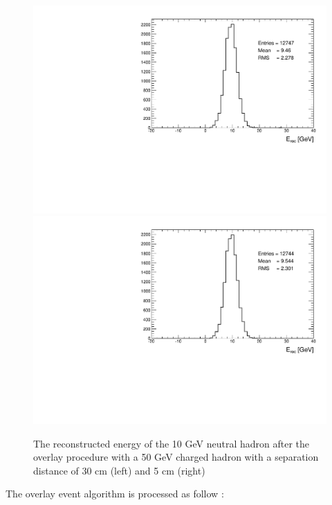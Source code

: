 \documentclass[cits]{JINST}
\begin{document}
\begin{figure}[!h]
  \begin{center}
    \includegraphics[width=0.47\linewidth]{plots/histo_neutral_mcenergy_ArborPFA_TestBeam_10GeV_n_50GeV_ch_30_cm.pdf}
    \includegraphics[width=0.47\linewidth]{plots/histo_neutral_mcenergy_ArborPFA_TestBeam_10GeV_n_50GeV_ch_5_cm.pdf}
  \end{center}
  \caption{\label{OVERLAY_EVENT_MC_EREC_OVERLAID_HITS} The reconstructed energy of the 10 GeV neutral hadron after the overlay procedure with a 50 GeV charged hadron with a separation distance of 30 cm (left) and 5 cm (right)}
\end{figure}

The overlay event algorithm is processed as follow :
\end{document}
